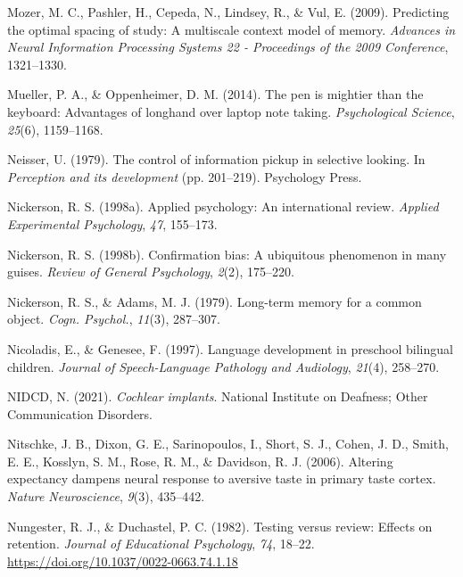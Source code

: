 \documentclass[
]{krantz}
\newlength{\cslhangindent}
\newlength{\cslentryspacingunit} %
\newenvironment{CSLReferences}[2] %
 {%
  \setlength{\parindent}{0pt}
  \ifodd #1
  \let\oldpar\par
  \def\par{\hangindent=\cslhangindent\oldpar}
  \fi
  \setlength{\parskip}{#2\cslentryspacingunit}
 }%
 {}
\begin{document}
\begin{CSLReferences}{1}{0}
\leavevmode{}%
Mozer, M. C., Pashler, H., Cepeda, N., Lindsey, R., \& Vul, E. (2009). Predicting the optimal spacing of study: A multiscale context model of memory. \emph{Advances in Neural Information Processing Systems 22 - Proceedings of the 2009 Conference}, 1321--1330.

\leavevmode{}%
Mueller, P. A., \& Oppenheimer, D. M. (2014). The pen is mightier than the keyboard: Advantages of longhand over laptop note taking. \emph{Psychological Science}, \emph{25}(6), 1159--1168.

\leavevmode{}%
Neisser, U. (1979). The control of information pickup in selective looking. In \emph{Perception and its development} (pp. 201--219). Psychology Press.

\leavevmode{}%
Nickerson, R. S. (1998a). Applied psychology: An international review. \emph{Applied Experimental Psychology}, \emph{47}, 155--173.

\leavevmode{}%
Nickerson, R. S. (1998b). Confirmation bias: A ubiquitous phenomenon in many guises. \emph{Review of General Psychology}, \emph{2}(2), 175--220.

\leavevmode{}%
Nickerson, R. S., \& Adams, M. J. (1979). Long-term memory for a common object. \emph{Cogn. Psychol.}, \emph{11}(3), 287--307.

\leavevmode{}%
Nicoladis, E., \& Genesee, F. (1997). Language development in preschool bilingual children. \emph{Journal of Speech-Language Pathology and Audiology}, \emph{21}(4), 258--270.

\leavevmode{}%
NIDCD, N. (2021). \emph{Cochlear implants}. National Institute on Deafness; Other Communication Disorders.

\leavevmode{}%
Nitschke, J. B., Dixon, G. E., Sarinopoulos, I., Short, S. J., Cohen, J. D., Smith, E. E., Kosslyn, S. M., Rose, R. M., \& Davidson, R. J. (2006). Altering expectancy dampens neural response to aversive taste in primary taste cortex. \emph{Nature Neuroscience}, \emph{9}(3), 435--442.

\leavevmode{}%
Nungester, R. J., \& Duchastel, P. C. (1982). Testing versus review: Effects on retention. \emph{Journal of Educational Psychology}, \emph{74}, 18--22. \url{https://doi.org/10.1037/0022-0663.74.1.18}


\end{CSLReferences}
\end{document}
